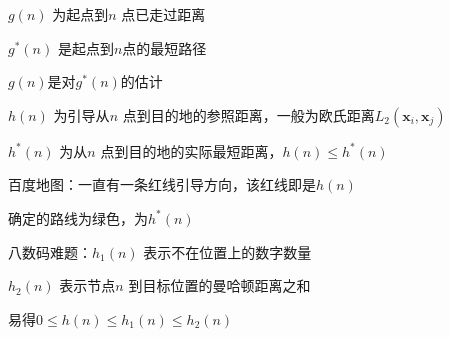$g\left( n \right) $ 为起点到$n$ 点已走过距离

$g^{*}\left( n \right) $ 是起点到$n$点的最短路径

$g\left( n \right) $是对$g^{*}\left( n \right) $的估计

$h\left( n \right) $ 为引导从$n$ 点到目的地的参照距离，一般为欧氏距离$L_2\left( \bm{x}_i,\bm{x}_j \right) $

$h^{*}\left( n \right) $ 为从$n$ 点到目的地的实际最短距离，$h\left( n \right) \le h^{*}\left( n \right) $
\begin{eg}
    百度地图：一直有一条红线引导方向，该红线即是$h\left( n \right) $ 

    确定的路线为绿色，为$h^{*}\left( n \right) $
\end{eg}
\begin{eg}
    八数码难题：$h_1\left( n \right) $ 表示不在位置上的数字数量

     $h_2\left( n \right) $ 表示节点$n$ 到目标位置的曼哈顿距离之和

     易得$0\le h\left( n \right) \le h_1\left( n \right) \le h_2\left( n \right) $
\end{eg}

